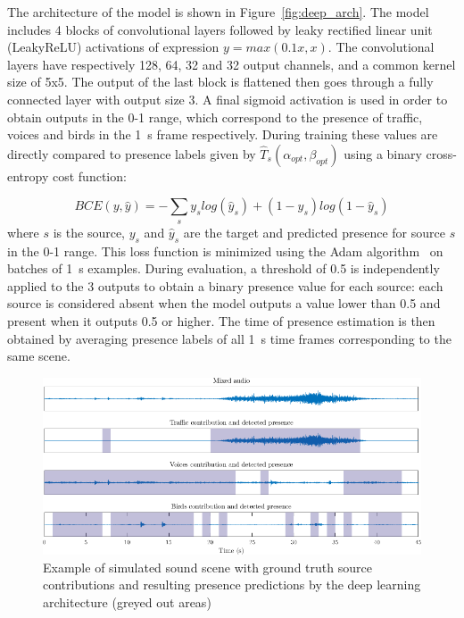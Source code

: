 \documentclass[twocolumn]{article}
\begin{document}
The architecture of the model is shown in Figure~\ref{fig:deep_arch}. The model includes 4 blocks of convolutional layers followed by leaky rectified linear unit (LeakyReLU) activations of expression $y = max(0.1x, x)$. The convolutional layers have respectively 128, 64, 32 and 32 output channels, and a common kernel size of 5x5. The output of the last block is flattened then goes through a fully connected layer with output size 3. A final sigmoid activation is used in order to obtain outputs in the 0-1 range, which correspond to the presence of traffic, voices and birds in the 1~s frame respectively. During training these values are directly compared to presence labels given by $\hat T_s(\alpha_{opt}, \beta_{opt})$ using a binary cross-entropy cost function:

\begin{equation}
BCE(y, \hat y) = -\sum_s y_s log\left(\hat y_s\right) + (1-y_s) log\left(1-\hat y_s\right)
\end{equation}
where $s$ is the source, $y_s$ and $\hat y_s$ are the target and predicted presence for source $s$ in the 0-1 range. This loss function is minimized using the Adam algorithm~\cite{kingma2015} on batches of 1~s examples. During evaluation, a threshold of 0.5 is independently applied to the 3 outputs to obtain a binary presence value for each source: each source is considered absent when the model outputs a value lower than 0.5 and present when it outputs 0.5 or higher. The time of presence estimation is then obtained by averaging presence labels of all 1~s time frames corresponding to the same scene.

\begin{figure}[t!]
    \centering
    \includegraphics[width=1.5\columnwidth]{figures/pred_ex.png}
    \caption{Example of simulated sound scene with ground truth source contributions and resulting presence predictions by the deep learning architecture (greyed out areas)}\label{fig:pred_ex}
\end{figure}
\end{document}
